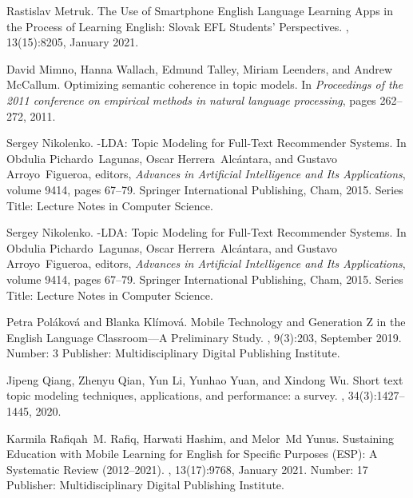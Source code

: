 \begin{thebibliography}{10}
Rastislav Metruk.
\newblock The {Use} of {Smartphone} {English} {Language} {Learning} {Apps} in
  the {Process} of {Learning} {English}: {Slovak} {EFL} {Students}’
  {Perspectives}.
, 13(15):8205, January 2021.

David Mimno, Hanna Wallach, Edmund Talley, Miriam Leenders, and Andrew
  McCallum.
\newblock Optimizing semantic coherence in topic models.
\newblock In {\em Proceedings of the 2011 conference on empirical methods in
  natural language processing}, pages 262--272, 2011.

Sergey Nikolenko.
-{LDA}: {Topic} {Modeling} for {Full}-{Text} {Recommender}
  {Systems}.
\newblock In Obdulia Pichardo~Lagunas, Oscar Herrera~Alcántara, and Gustavo
  Arroyo~Figueroa, editors, {\em Advances in {Artificial} {Intelligence} and
  {Its} {Applications}}, volume 9414, pages 67--79. Springer International
  Publishing, Cham, 2015.
\newblock Series Title: Lecture Notes in Computer Science.

Sergey Nikolenko.
-{LDA}: {Topic} {Modeling} for {Full}-{Text} {Recommender}
  {Systems}.
\newblock In Obdulia Pichardo~Lagunas, Oscar Herrera~Alcántara, and Gustavo
  Arroyo~Figueroa, editors, {\em Advances in {Artificial} {Intelligence} and
  {Its} {Applications}}, volume 9414, pages 67--79. Springer International
  Publishing, Cham, 2015.
\newblock Series Title: Lecture Notes in Computer Science.

Petra Poláková and Blanka Klímová.
\newblock Mobile {Technology} and {Generation} {Z} in the {English} {Language}
  {Classroom}—{A} {Preliminary} {Study}.
, 9(3):203, September 2019.
\newblock Number: 3 Publisher: Multidisciplinary Digital Publishing Institute.

Jipeng Qiang, Zhenyu Qian, Yun Li, Yunhao Yuan, and Xindong Wu.
\newblock Short text topic modeling techniques, applications, and performance:
  a survey.
,
  34(3):1427--1445, 2020.

Karmila Rafiqah~M. Rafiq, Harwati Hashim, and Melor~Md Yunus.
\newblock Sustaining {Education} with {Mobile} {Learning} for {English} for
  {Specific} {Purposes} ({ESP}): {A} {Systematic} {Review} (2012–2021).
, 13(17):9768, January 2021.
\newblock Number: 17 Publisher: Multidisciplinary Digital Publishing Institute.


\end{thebibliography}
